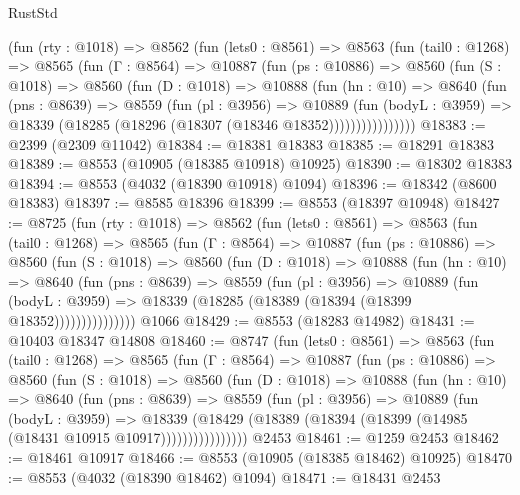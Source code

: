 \begin{lexlean}{RustStd}
\begin{coremodule}
      (fun (rty : @1018) =>
      @8562
        (fun (lets0 : @8561) =>
        @8563
          (fun (tail0 : @1268) =>
          @8565
            (fun (Γ : @8564) =>
            @10887
              (fun (ps : @10886) =>
              @8560
                (fun (S : @1018) =>
                @8560
                  (fun (D : @1018) =>
                  @10888
                    (fun (hn : @10) =>
                    @8640
                      (fun (pns : @8639) =>
                      @8559
                        (fun (pl : @3956) =>
                        @10889
                          (fun (bodyL : @3959) =>
                          @18339 (@18285 (@18296 (@18307 (@18346 @18352))))))))))))))))
@18383 := @2399 (@2309 @11042)
@18384 := @18381 @18383
@18385 := @18291 @18383
@18389 := @8553 (@10905 (@18385 @10918) @10925)
@18390 := @18302 @18383
@18394 := @8553 (@4032 (@18390 @10918) @1094)
@18396 := @18342 (@8600 @18383)
@18397 := @8585 @18396
@18399 := @8553 (@18397 @10948)
@18427 := @8725
    (fun (rty : @1018) =>
    @8562
      (fun (lets0 : @8561) =>
      @8563
        (fun (tail0 : @1268) =>
        @8565
          (fun (Γ : @8564) =>
          @10887
            (fun (ps : @10886) =>
            @8560
              (fun (S : @1018) =>
              @8560
                (fun (D : @1018) =>
                @10888
                  (fun (hn : @10) =>
                  @8640
                    (fun (pns : @8639) =>
                    @8559
                      (fun (pl : @3956) =>
                      @10889
                        (fun (bodyL : @3959) =>
                        @18339 (@18285 (@18389 (@18394 (@18399 @18352)))))))))))))))
    @1066
@18429 := @8553 (@18283 @14982)
@18431 := @10403 @18347 @14808
@18460 := @8747
    (fun (lets0 : @8561) =>
    @8563
      (fun (tail0 : @1268) =>
      @8565
        (fun (Γ : @8564) =>
        @10887
          (fun (ps : @10886) =>
          @8560
            (fun (S : @1018) =>
            @8560
              (fun (D : @1018) =>
              @10888
                (fun (hn : @10) =>
                @8640
                  (fun (pns : @8639) =>
                  @8559
                    (fun (pl : @3956) =>
                    @10889
                      (fun (bodyL : @3959) =>
                      @18339
                        (@18429
                          (@18389 (@18394 (@18399 (@14985 (@18431 @10915 @10917))))))))))))))))
    @2453
@18461 := @1259 @2453
@18462 := @18461 @10917
@18466 := @8553 (@10905 (@18385 @18462) @10925)
@18470 := @8553 (@4032 (@18390 @18462) @1094)
@18471 := @18431 @2453

\end{coremodule}
\end{lexlean}
